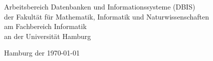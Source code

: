 \begin{titlepage}
	\begin{center}
		\vfill
		
		Arbeitsbereich Datenbanken und Informationssysteme (DBIS)\\
		der Fakultät für Mathematik, Informatik und Naturwissenschaften\\
		am Fachbereich Informatik\\
		an der Universität Hamburg
		
		
		\vspace{1cm}
		
		{
			Hamburg der \today
		}
	\end{center}
\end{titlepage}

\restoregeometry